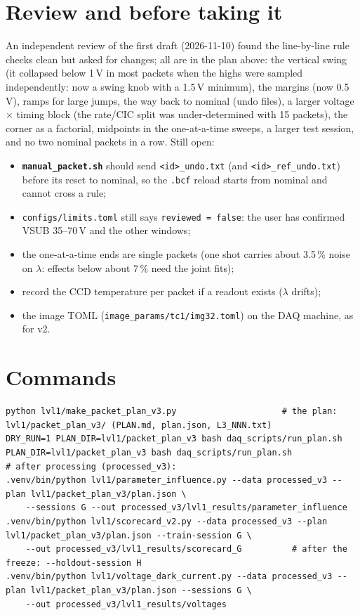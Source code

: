 \documentclass[11pt]{article}
\begin{document}
\section{Review and before taking it}
An independent review of the first draft (2026-11-10) found the line-by-line rule checks clean but asked for changes; all
are in the plan above: the vertical swing (it collapsed below 1\,V in most packets when the highs were sampled
independently: now a swing knob with a 1.5\,V minimum), the margins (now 0.5\,V), ramps for large jumps, the way back to
nominal (undo files), a larger voltage $\times$ timing block (the rate/CIC split was under-determined with 15 packets),
the corner as a factorial, midpoints in the one-at-a-time sweeps, a larger test session, and no two nominal packets in a
row. Still open:
\begin{itemize}
\item \textbf{\texttt{manual\_packet.sh}} should send \texttt{<id>\_undo.txt} (and \texttt{<id>\_ref\_undo.txt}) before
  its reset to nominal, so the \texttt{.bcf} reload starts from nominal and cannot cross a rule;
\item \texttt{configs/limits.toml} still says \texttt{reviewed = false}: the user has confirmed VSUB 35--70\,V and the
  other windows;
\item the one-at-a-time ends are single packets (one shot carries about 3.5\,\% noise on $\lambda$: effects below about
  7\,\% need the joint fits);
\item record the CCD temperature per packet if a readout exists ($\lambda$ drifts);
\item the image TOML (\texttt{image\_params/tc1/img32.toml}) on the DAQ machine, as for v2.
\end{itemize}

\section{Commands}
\begin{Verbatim}
python lvl1/make_packet_plan_v3.py                     # the plan: lvl1/packet_plan_v3/ (PLAN.md, plan.json, L3_NNN.txt)
DRY_RUN=1 PLAN_DIR=lvl1/packet_plan_v3 bash daq_scripts/run_plan.sh
PLAN_DIR=lvl1/packet_plan_v3 bash daq_scripts/run_plan.sh
# after processing (processed_v3):
.venv/bin/python lvl1/parameter_influence.py --data processed_v3 --plan lvl1/packet_plan_v3/plan.json \
    --sessions G --out processed_v3/lvl1_results/parameter_influence
.venv/bin/python lvl1/scorecard_v2.py --data processed_v3 --plan lvl1/packet_plan_v3/plan.json --train-session G \
    --out processed_v3/lvl1_results/scorecard_G          # after the freeze: --holdout-session H
.venv/bin/python lvl1/voltage_dark_current.py --data processed_v3 --plan lvl1/packet_plan_v3/plan.json --sessions G \
    --out processed_v3/lvl1_results/voltages
\end{Verbatim}
\end{document}
